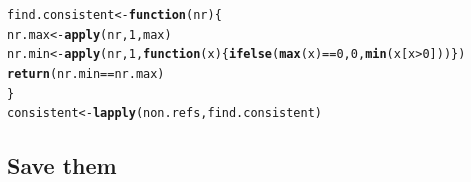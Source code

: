 \documentclass{article}\usepackage[]{graphicx}\usepackage[]{color}
\makeatletter
\newcommand{\hlnum}[1]{\textcolor[rgb]{0.686,0.059,0.569}{#1}}%
\newcommand{\hlopt}[1]{\textcolor[rgb]{0,0,0}{#1}}%
\newcommand{\hlstd}[1]{\textcolor[rgb]{0.345,0.345,0.345}{#1}}%
\newcommand{\hlkwa}[1]{\textcolor[rgb]{0.161,0.373,0.58}{\textbf{#1}}}%
\newcommand{\hlkwb}[1]{\textcolor[rgb]{0.69,0.353,0.396}{#1}}%
\newcommand{\hlkwc}[1]{\textcolor[rgb]{0.333,0.667,0.333}{#1}}%
\newcommand{\hlkwd}[1]{\textcolor[rgb]{0.737,0.353,0.396}{\textbf{#1}}}%
\newenvironment{kframe}{%
 \def\at@end@of@kframe{}%
 \ifinner\ifhmode%
  \def\at@end@of@kframe{\end{minipage}}%
  \begin{minipage}{\columnwidth}%
 \fi\fi%
 \def\FrameCommand##1{\hskip\@totalleftmargin \hskip-\fboxsep
 \colorbox{shadecolor}{##1}\hskip-\fboxsep
     \hskip-\linewidth \hskip-\@totalleftmargin \hskip\columnwidth}%
 \MakeFramed {\advance\hsize-\width
   \@totalleftmargin\z@ \linewidth\hsize
   \@setminipage}}%
 {\par\unskip\endMakeFramed%
 \at@end@of@kframe}
\newenvironment{knitrout}{}{} %
\makeatother
\begin{document}
\begin{knitrout}\footnotesize
{}\color{fgcolor}\begin{kframe}
\begin{alltt}
\hlstd{find.consistent} \hlkwb{<-} \hlkwa{function}\hlstd{(}\hlkwc{nr}\hlstd{)\{}
  \hlstd{nr.max} \hlkwb{<-} \hlkwd{apply}\hlstd{(nr,}\hlnum{1}\hlstd{,max)}
  \hlstd{nr.min} \hlkwb{<-} \hlkwd{apply}\hlstd{(nr,}\hlnum{1}\hlstd{,}\hlkwa{function}\hlstd{(}\hlkwc{x}\hlstd{)\{}\hlkwd{ifelse}\hlstd{(}\hlkwd{max}\hlstd{(x)}\hlopt{==}\hlnum{0}\hlstd{,}\hlnum{0}\hlstd{,}\hlkwd{min}\hlstd{(x[x}\hlopt{>}\hlnum{0}\hlstd{]))\})}
  \hlkwd{return}\hlstd{(nr.min} \hlopt{==} \hlstd{nr.max)}
\hlstd{\}}
\hlstd{consistent}  \hlkwb{<-} \hlkwd{lapply}\hlstd{(non.refs, find.consistent)}
\end{alltt}
\end{kframe}
\end{knitrout}

\subsection{Save them}
\end{document}
